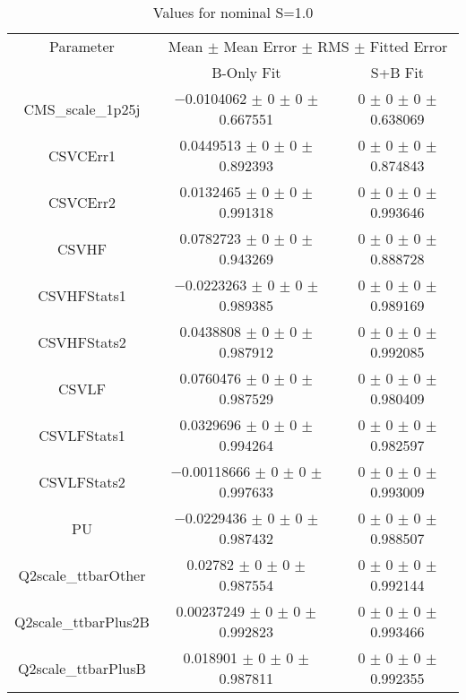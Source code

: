 \begin{table}
\centering
\caption{Values for nominal S=1.0}
\begin{tabular}{ccc}
\toprule
Parameter & \multicolumn{2}{c}{Mean $\pm$ Mean Error $\pm$ RMS $\pm$ Fitted Error}\\
 & B-Only Fit & S+B Fit\\
\midrule
CMS\_scale\_1p25j & \num{-0.0104062} $\pm$ \num{0} $\pm$ \num{0} $\pm$ \num{0.667551} & \num{0} $\pm$ \num{0} $\pm$ \num{0} $\pm$ \num{0.638069}\\
CSVCErr1 & \num{0.0449513} $\pm$ \num{0} $\pm$ \num{0} $\pm$ \num{0.892393} & \num{0} $\pm$ \num{0} $\pm$ \num{0} $\pm$ \num{0.874843}\\
CSVCErr2 & \num{0.0132465} $\pm$ \num{0} $\pm$ \num{0} $\pm$ \num{0.991318} & \num{0} $\pm$ \num{0} $\pm$ \num{0} $\pm$ \num{0.993646}\\
CSVHF & \num{0.0782723} $\pm$ \num{0} $\pm$ \num{0} $\pm$ \num{0.943269} & \num{0} $\pm$ \num{0} $\pm$ \num{0} $\pm$ \num{0.888728}\\
CSVHFStats1 & \num{-0.0223263} $\pm$ \num{0} $\pm$ \num{0} $\pm$ \num{0.989385} & \num{0} $\pm$ \num{0} $\pm$ \num{0} $\pm$ \num{0.989169}\\
CSVHFStats2 & \num{0.0438808} $\pm$ \num{0} $\pm$ \num{0} $\pm$ \num{0.987912} & \num{0} $\pm$ \num{0} $\pm$ \num{0} $\pm$ \num{0.992085}\\
CSVLF & \num{0.0760476} $\pm$ \num{0} $\pm$ \num{0} $\pm$ \num{0.987529} & \num{0} $\pm$ \num{0} $\pm$ \num{0} $\pm$ \num{0.980409}\\
CSVLFStats1 & \num{0.0329696} $\pm$ \num{0} $\pm$ \num{0} $\pm$ \num{0.994264} & \num{0} $\pm$ \num{0} $\pm$ \num{0} $\pm$ \num{0.982597}\\
CSVLFStats2 & \num{-0.00118666} $\pm$ \num{0} $\pm$ \num{0} $\pm$ \num{0.997633} & \num{0} $\pm$ \num{0} $\pm$ \num{0} $\pm$ \num{0.993009}\\
PU & \num{-0.0229436} $\pm$ \num{0} $\pm$ \num{0} $\pm$ \num{0.987432} & \num{0} $\pm$ \num{0} $\pm$ \num{0} $\pm$ \num{0.988507}\\
Q2scale\_ttbarOther & \num{0.02782} $\pm$ \num{0} $\pm$ \num{0} $\pm$ \num{0.987554} & \num{0} $\pm$ \num{0} $\pm$ \num{0} $\pm$ \num{0.992144}\\
Q2scale\_ttbarPlus2B & \num{0.00237249} $\pm$ \num{0} $\pm$ \num{0} $\pm$ \num{0.992823} & \num{0} $\pm$ \num{0} $\pm$ \num{0} $\pm$ \num{0.993466}\\
Q2scale\_ttbarPlusB & \num{0.018901} $\pm$ \num{0} $\pm$ \num{0} $\pm$ \num{0.987811} & \num{0} $\pm$ \num{0} $\pm$ \num{0} $\pm$ \num{0.992355}\\

\end{tabular}
\end{table}
